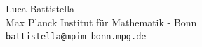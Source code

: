 \documentclass[11pt]{amsart}
\newcommand{\lev}{\operatorname{lev}}
\theoremstyle{plain}
\theoremstyle{definition}
\newtheorem{dfn}[thm]{Definition}
\newtheorem{rem}[thm]{Remark}
\begin{document}

\noindent Luca Battistella\\
Max Planck Institut f\"ur Mathematik - Bonn \\
\texttt{battistella@mpim-bonn.mpg.de}\\
\end{document}
